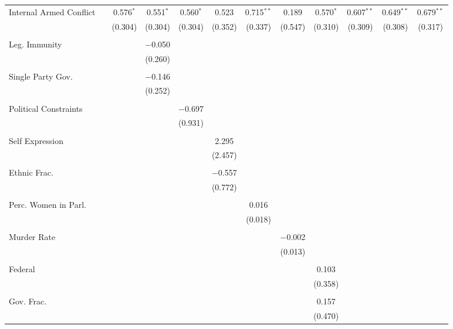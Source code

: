 \documentclass[a4paper]{article}\usepackage[]{graphicx}\usepackage[]{color}
\begin{document}
\begin{table}[H]
\begin{center}
{{\begin{tabular}{@{\extracolsep{5pt}}lccccccccccc}
 Internal Armed Conflict &  & 0.576$^{*}$ & 0.551$^{*}$ & 0.560$^{*}$ & 0.523 & 0.715$^{**}$ & 0.189 & 0.570$^{*}$ & 0.607$^{**}$ & 0.649$^{**}$ & 0.679$^{**}$ \\ 
  &  & (0.304) & (0.304) & (0.304) & (0.352) & (0.337) & (0.547) & (0.310) & (0.309) & (0.308) & (0.317) \\ 
  & & & & & & & & & & & \\ 
 Leg. Immunity &  &  & $-$0.050 &  &  &  &  &  &  &  &  \\ 
  &  &  & (0.260) &  &  &  &  &  &  &  &  \\ 
  & & & & & & & & & & & \\ 
 Single Party Gov. &  &  & $-$0.146 &  &  &  &  &  &  &  &  \\ 
  &  &  & (0.252) &  &  &  &  &  &  &  &  \\ 
  & & & & & & & & & & & \\ 
 Political Constraints &  &  &  & $-$0.697 &  &  &  &  &  &  &  \\ 
  &  &  &  & (0.931) &  &  &  &  &  &  &  \\ 
  & & & & & & & & & & & \\ 
 Self Expression &  &  &  &  & 2.295 &  &  &  &  &  &  \\ 
  &  &  &  &  & (2.457) &  &  &  &  &  &  \\ 
  & & & & & & & & & & & \\ 
 Ethnic Frac. &  &  &  &  & $-$0.557 &  &  &  &  &  &  \\ 
  &  &  &  &  & (0.772) &  &  &  &  &  &  \\ 
  & & & & & & & & & & & \\ 
 Perc. Women in Parl. &  &  &  &  &  & 0.016 &  &  &  &  &  \\ 
  &  &  &  &  &  & (0.018) &  &  &  &  &  \\ 
  & & & & & & & & & & & \\ 
 Murder Rate &  &  &  &  &  &  & $-$0.002 &  &  &  &  \\ 
  &  &  &  &  &  &  & (0.013) &  &  &  &  \\ 
  & & & & & & & & & & & \\ 
 Federal &  &  &  &  &  &  &  & 0.103 &  &  &  \\ 
  &  &  &  &  &  &  &  & (0.358) &  &  &  \\ 
  & & & & & & & & & & & \\ 
 Gov. Frac. &  &  &  &  &  &  &  & 0.157 &  &  &  \\ 
  &  &  &  &  &  &  &  & (0.470) &  &  &  \\ 

\end{tabular}}}
\end{center}
\end{table}
\end{document}
